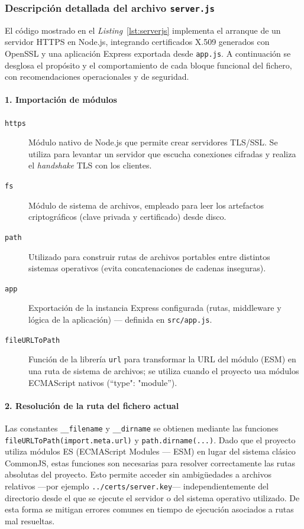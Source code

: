 \subsubsection*{Descripción detallada del archivo \texttt{server.js}}
\label{subsubsec:serverjs_descripcion}

El código mostrado en el \textit{Listing}~\ref{lst:serverjs} implementa el arranque de un servidor HTTPS en Node.js, integrando certificados X.509 generados con OpenSSL y una aplicación Express exportada desde \texttt{app.js}. A continuación se desglosa el propósito y el comportamiento de cada bloque funcional del fichero, con recomendaciones operacionales y de seguridad.

\paragraph{1. Importación de módulos}
\begin{description}
  \item[\texttt{https}] Módulo nativo de Node.js que permite crear servidores TLS/SSL. Se utiliza para levantar un servidor que escucha conexiones cifradas y realiza el \textit{handshake} TLS con los clientes.
  \item[\texttt{fs}] Módulo de sistema de archivos, empleado para leer los artefactos criptográficos (clave privada y certificado) desde disco.
  \item[\texttt{path}] Utilizado para construir rutas de archivos portables entre distintos sistemas operativos (evita concatenaciones de cadenas inseguras).
  \item[\texttt{app}] Exportación de la instancia Express configurada (rutas, middleware y lógica de la aplicación) — definida en \texttt{src/app.js}.
  \item[\texttt{fileURLToPath}] Función de la librería \texttt{url} para transformar la URL del módulo (ESM) en una ruta de sistema de archivos; se utiliza cuando el proyecto usa módulos ECMAScript nativos (``type": "module'').
\end{description}

\paragraph{2. Resolución de la ruta del fichero actual}
Las constantes \texttt{\_\_filename} y \texttt{\_\_dirname} se obtienen mediante las funciones \texttt{fileURLToPath(import.meta.url)} y \texttt{path.dirname(...)}. Dado que el proyecto utiliza módulos ES (ECMAScript Modules — ESM) en lugar del sistema clásico CommonJS, estas funciones son necesarias para resolver correctamente las rutas absolutas del proyecto. Esto permite acceder sin ambigüedades a archivos relativos —por ejemplo \texttt{../certs/server.key}— independientemente del directorio desde el que se ejecute el servidor o del sistema operativo utilizado. De esta forma se mitigan errores comunes en tiempo de ejecución asociados a rutas mal resueltas.

